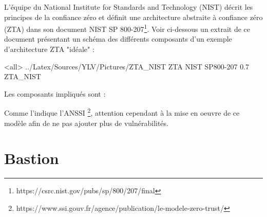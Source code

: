 L’équipe du National Institute for Standards and Technology (NIST) décrit les principes de la confiance zéro et définit une architecture abstraite à confiance zéro (ZTA) dans son document NIST SP 800-207\footnote{https://csrc.nist.gov/pubs/sp/800/207/final}. Voir ci-dessous un extrait de ce document présentant un schéma des différents composants d'un exemple d'architecture ZTA "idéale" :

\mode<all>{\picframe
{../Latex/Sources/YLV/Pictures/ZTA_NIST}%
{ZTA NIST SP800-207} %
{0.7} %
{ZTA_NIST} %
}

Les composants impliqués sont :


Comme l'indique l'ANSSI \footnote{https://www.ssi.gouv.fr/agence/publication/le-modele-zero-trust/}, attention cependant à la mise en oeuvre de ce modèle afin de ne pas ajouter plus de vulnérabilités.



\section{Bastion}

